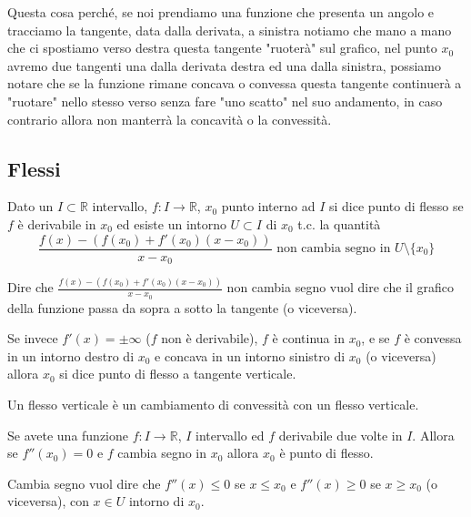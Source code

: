 \hspace{-15pt}Questa cosa perché, se noi prendiamo una funzione che presenta un angolo e tracciamo la tangente, data dalla derivata, a sinistra notiamo che mano a mano che ci spostiamo verso destra questa tangente "ruoterà" sul grafico, nel punto $x_0$ avremo due tangenti una dalla derivata destra ed una dalla sinistra, possiamo notare che se la funzione rimane concava o convessa questa tangente continuerà a "ruotare" nello stesso verso senza fare "uno scatto" nel suo andamento, in caso contrario allora non manterrà la concavità o la convessità.

\subsection{Flessi}
\begin{definition}[Flesso]
Dato un $I\subset \mathbb{R}$ intervallo, $f: I\to \mathbb{R}$, $x_0$ punto interno ad $I$ si dice punto di flesso se $f$ è derivabile in $x_0$ ed esiste un intorno $U \subset I$ di $x_0$ t.c. la quantità
\[\frac{f(x) - (f(x_0) + f'(x_0)(x-x_0))}{x-x_0} \text{ non cambia segno in }U \setminus \{x_0\}\]
\end{definition}

\hspace{-15pt}Dire che $\frac{f(x) - (f(x_0) + f'(x_0)(x-x_0))}{x-x_0}$ non cambia segno vuol dire che il grafico della funzione passa da sopra a sotto la tangente (o viceversa).

\begin{definition}
Se invece $f'(x) = \pm\infty$ ($f$ non è derivabile), $f$ è continua in $x_0$, e se $f$ è convessa in un intorno destro di $x_0$ e concava in un intorno sinistro di $x_0$ (o viceversa) allora $x_0$ si dice punto di flesso a tangente verticale. 
\end{definition}

\hspace{-15pt}Un flesso verticale è un cambiamento di convessità con un flesso verticale.

\begin{observation}
Se avete una funzione $f: I \to \mathbb{R}$, $I$ intervallo ed $f$ derivabile due volte in $I$. Allora se $f''(x_0)=0$ e $f$ cambia segno in $x_0$ allora $x_0$ è punto di flesso.
\end{observation}

\hspace{-15pt}Cambia segno vuol dire che $f''(x) \leq 0$ se $x\leq x_0$ e $f''(x) \geq 0$ se $x\geq x_0$ (o viceversa), con $x \in U$ intorno di $x_0$.


